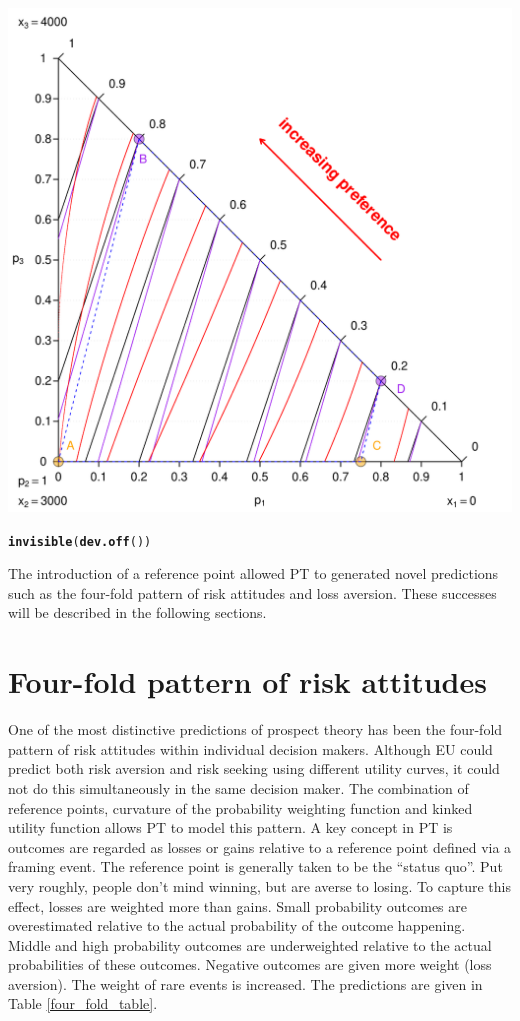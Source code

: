 \documentclass{article}\usepackage[]{graphicx}\usepackage[]{color}
\makeatletter
\newcommand{\hlstd}[1]{\textcolor[rgb]{0.345,0.345,0.345}{#1}}%
\newcommand{\hlkwd}[1]{\textcolor[rgb]{0.737,0.353,0.396}{\textbf{#1}}}%
\newenvironment{kframe}{%
 \def\at@end@of@kframe{}%
 \ifinner\ifhmode%
  \def\at@end@of@kframe{\end{minipage}}%
  \begin{minipage}{\columnwidth}%
 \fi\fi%
 \def\FrameCommand##1{\hskip\@totalleftmargin \hskip-\fboxsep
 \colorbox{shadecolor}{##1}\hskip-\fboxsep
     \hskip-\linewidth \hskip-\@totalleftmargin \hskip\columnwidth}%
 \MakeFramed {\advance\hsize-\width
   \@totalleftmargin\z@ \linewidth\hsize
   \@setminipage}}%
 {\par\unskip\endMakeFramed%
 \at@end@of@kframe}
\newenvironment{knitrout}{}{} %
\makeatother
\begin{document}
\begin{knitrout}
{\centering \includegraphics[width=0.8\linewidth]{figure/unnamed-chunk-30} 

}


\begin{kframe}\begin{alltt}
\hlkwd{invisible}\hlstd{(}\hlkwd{dev.off}\hlstd{())}
\end{alltt}
\end{kframe}
\end{knitrout}


The introduction of a reference point allowed PT to generated novel predictions such as the four-fold pattern of risk attitudes and loss aversion. These successes will be described in the following sections.

\section{Four-fold pattern of risk attitudes}

One of the most distinctive predictions of prospect theory has been the four-fold pattern of risk attitudes within
individual decision makers. Although EU could predict both risk aversion and risk seeking using different utility curves, it could not do this simultaneously in the same decision maker.
The combination of reference points, curvature of the probability weighting function and kinked utility function allows PT to model this pattern.
A key concept in PT is outcomes are regarded as losses or gains relative to a reference point defined via a framing event.
The reference point is generally taken to be the ``status quo''.
Put very roughly, people don't mind winning, but are averse to losing. To capture this effect, losses are weighted more than gains. Small probability outcomes are overestimated relative to the actual probability of the outcome happening.
Middle and high probability outcomes are underweighted relative to the actual probabilities of these outcomes.
Negative outcomes are given more weight (loss aversion). The weight of rare events is increased.
The predictions are given in Table \ref{four_fold_table}.
\end{document}
